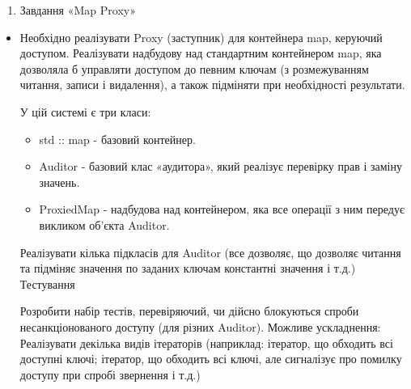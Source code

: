 \documentclass[]{article}
\begin{document}
\begin{enumerate}
\def\labelenumi{\arabic{enumi}.}
\item
  Завдання «Map Proxy»
\end{enumerate}

\begin{itemize}
\item
  Необхідно реалізувати Proxy (заступник) для контейнера map, керуючий
  доступом. Реалізувати надбудову над стандартним контейнером map, яка
  дозволяла б управляти доступом до певним ключам (з розмежуванням
  читання, записи і видалення), а також підміняти при необхідності
  результати.

  У цій системі є три класи:

  \begin{itemize}
  \item
    std :: map - базовий контейнер.
  \item
    Auditor - базовий клас «аудитора», який реалізує перевірку прав і
    заміну значень.
  \item
    ProxiedMap - надбудова над контейнером, яка все операції з ним
    передує викликом об'єкта Auditor.
  \end{itemize}

  Реалізувати кілька підкласів для Auditor (все дозволяє, що дозволяє
  читання та підміняє значення по заданих ключам константні значення і
  т.д.) Тестування

  Розробити набір тестів, перевіряючий, чи дійсно блокуються спроби
  несанкціонованого доступу (для різних Auditor). Можливе ускладнення:
  Реалізувати декілька видів ітераторів (наприклад: ітератор, що
  обходить всі доступні ключі; ітератор, що обходить всі ключі, але
  сигналізує про помилку доступу при спробі звернення і т.д.)
\end{itemize}
\end{document}
